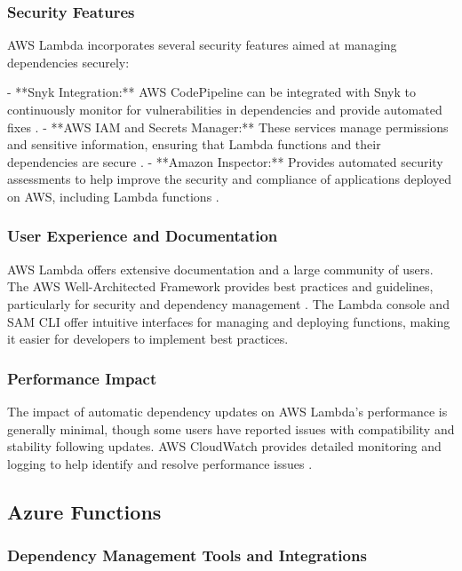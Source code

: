 \documentclass[12pt, letterpaper]{article}
\begin{document}
\subsubsection{Security Features}

AWS Lambda incorporates several security features aimed at managing dependencies securely:

- **Snyk Integration:** AWS CodePipeline can be integrated with Snyk to continuously monitor for vulnerabilities in dependencies and provide automated fixes \cite{snykaws2023}.
- **AWS IAM and Secrets Manager:** These services manage permissions and sensitive information, ensuring that Lambda functions and their dependencies are secure \cite{awsSecurity2023}.
- **Amazon Inspector:** Provides automated security assessments to help improve the security and compliance of applications deployed on AWS, including Lambda functions \cite{awsinspector2023}.

\subsubsection{User Experience and Documentation}

AWS Lambda offers extensive documentation and a large community of users. The AWS Well-Architected Framework provides best practices and guidelines, particularly for security and dependency management \cite{awsWell2023}. The Lambda console and SAM CLI offer intuitive interfaces for managing and deploying functions, making it easier for developers to implement best practices.

\subsubsection{Performance Impact}

The impact of automatic dependency updates on AWS Lambda's performance is generally minimal, though some users have reported issues with compatibility and stability following updates. AWS CloudWatch provides detailed monitoring and logging to help identify and resolve performance issues \cite{lambdaPerformance2023}.

\subsection{Azure Functions}

\subsubsection{Dependency Management Tools and Integrations}
\end{document}

